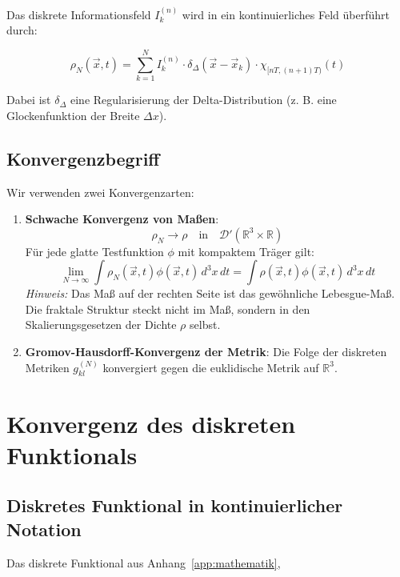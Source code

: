 Das diskrete Informationsfeld \( I_k^{(n)} \) wird in ein kontinuierliches Feld überführt durch:

\[
\rho_N(\vec{x}, t) = \sum_{k=1}^N I_k^{(n)} \cdot \delta_\Delta(\vec{x} - \vec{x}_k) \cdot
\chi_{[nT, (n+1)T)}(t)
\]

Dabei ist \( \delta_\Delta \) eine Regularisierung der Delta-Distribution (z. B. eine Glockenfunktion
der Breite \( \Delta x \)).

\subsection{Konvergenzbegriff}
\label{sub:kontinuumslimes_konvergenz}

Wir verwenden zwei Konvergenzarten:

\begin{enumerate}
    \item \textbf{Schwache Konvergenz von Maßen}:
          \[
          \rho_N \to \rho \quad \text{in} \quad \mathcal{D}'(\mathbb{R}^3 \times \mathbb{R})
          \]
          Für jede glatte Testfunktion \( \phi \) mit kompaktem Träger gilt:
          \[
          \lim_{N \to \infty} \int \rho_N(\vec{x}, t) \phi(\vec{x}, t) \, d^3x \, dt =
          \int \rho(\vec{x}, t) \phi(\vec{x}, t) \, d^3x \, dt
          \]
          \emph{Hinweis:} Das Maß auf der rechten Seite ist das gewöhnliche Lebesgue-Maß.
          Die fraktale Struktur steckt nicht im Maß, sondern in den Skalierungsgesetzen
          der Dichte \( \rho \) selbst.

    \item \textbf{Gromov-Hausdorff-Konvergenz der Metrik}:
          Die Folge der diskreten Metriken \( g_{kl}^{(N)} \) konvergiert gegen die
          euklidische Metrik auf \( \mathbb{R}^3 \).
\end{enumerate}

\section{Konvergenz des diskreten Funktionals}
\label{app:kontinuumslimes_funktional_konvergenz}

\subsection{Diskretes Funktional in kontinuierlicher Notation}
\label{sub:kontinuumslimes_funktional_diskret}

Das diskrete Funktional aus Anhang~\ref{app:mathematik},

